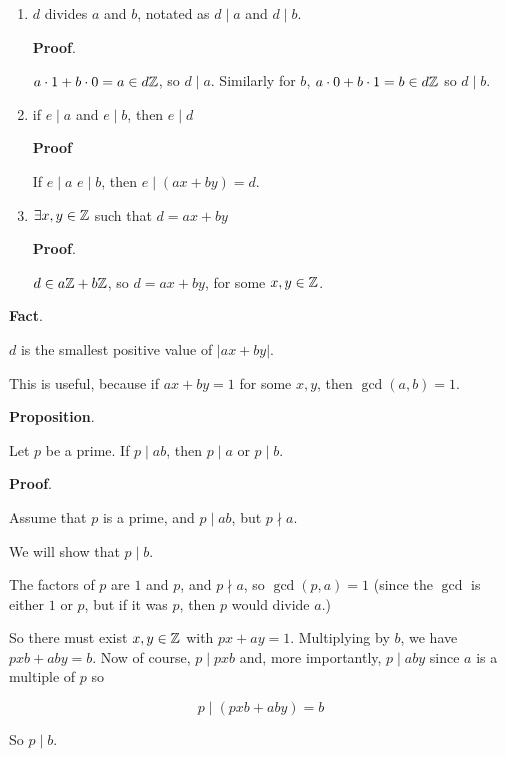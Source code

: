 \documentclass[12pt]{article}
\begin{document}
\begin{enumerate}
  \item $d$ divides $a$ and $b$, notated as $d \mid a$ and $d \mid b$.

    {\bf Proof}.

    $a \cdot 1 + b \cdot 0 = a \in d{\mathbb Z}$, so $d \mid a$. Similarly for $b$, $a \cdot
    0 + b \cdot 1 = b \in d{\mathbb Z}$ so $d \mid b$.

  \item if $e \mid a$ and $e \mid b$, then $e \mid d$

    {\bf Proof}

    If $e \mid a$ $e \mid b$, then $e \mid (ax + by) = d$.

  \item $\exists x, y \in {\mathbb Z}$ such that $d = ax + by$

    {\bf Proof}.

    $d \in a{\mathbb Z} + b{\mathbb Z}$, so $d = ax + by$, for some $x, y \in {\mathbb Z}$.
\end{enumerate}

{\bf Fact}.

$d$ is the smallest positive value of $|ax + by|$.

This is useful, because if $ax + by = 1$ for some $x, y$, then $\gcd(a, b) = 1$.


{\bf Proposition}.

Let $p$ be a prime. If $p \mid ab$, then $p \mid a$ or $p \mid b$.

{\bf Proof}.

Assume that $p$ is a prime, and $p \mid ab$, but $p \nmid a$.

We will show that $p \mid b$.

The factors of $p$ are $1$ and $p$, and $p \nmid a$, so $\gcd(p, a) = 1$ (since
the $\gcd$ is either $1$ or $p$, but if it was $p$, then $p$ would divide $a$.)

So there must exist $x, y \in {\mathbb Z}$ with $px + ay = 1$. Multiplying by $b$, we
have $pxb + aby = b$. Now of course, $p \mid pxb$ and, more importantly, $p \mid aby$
since $a$ is a multiple of $p$ so

\[
  p \mid (pxb + aby) = b
\]

So $p \mid b$.
\end{document}
